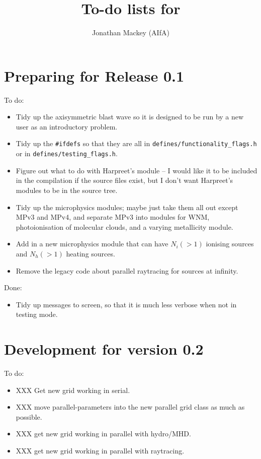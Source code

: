\documentclass[a4paper,11pt]{article}
\title{To-do lists for \pion{}}
\author{Jonathan Mackey (AIfA)}
\begin{document}
\maketitle

\section{Preparing for Release 0.1}
To do:
\begin{itemize}
\item Tidy up the axisymmetric blast wave so it is designed to be run by a new user as an introductory problem.
\item Tidy up the \texttt{\#ifdefs} so that they are all in \verb|defines/functionality_flags.h| or in \verb|defines/testing_flags.h|.
\item Figure out what to do with Harpreet's module -- I would like it to be included in the compilation if the source files exist, but I don't want Harpreet's modules to be in the source tree.
\item Tidy up the microphysics modules; maybe just take them all out except MPv3 and MPv4, and separate MPv3 into modules for WNM, photoionisation of molecular clouds, and a varying metallicity module.
\item Add in a new microphysics module that can have $N_i(>1)$ ionising sources and $N_h(>1)$ heating sources.
\item Remove the legacy code about parallel raytracing for sources at infinity.
\end{itemize}

Done:
\begin{itemize}
\item Tidy up messages to screen, so that it is much less verbose when not in testing mode.
\end{itemize}

\section{Development for version 0.2}
To do:
\begin{itemize}
\item XXX Get new grid working in serial.
\item XXX move parallel-parameters into the new parallel grid class as much as possible.
\item XXX get new grid working in parallel with hydro/MHD.
\item XXX get new grid working in parallel with raytracing.
\end{itemize}
\end{document}

